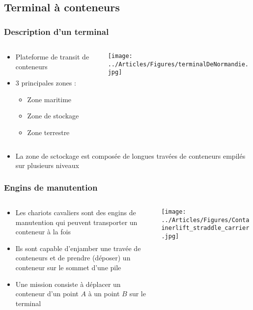 \documentclass{beamer}
\begin{document}
\subsection*{Terminal à conteneurs}
\begin{frame}
\frametitle{Description d'un terminal}

 	\begin{columns}
 	 	\begin{column}[l]{4.5cm}
			\begin{itemize}
				\item Plateforme de transit de conteneurs
				\item 3 principales zones : 
				\begin{itemize}
 					\item Zone maritime
					\item Zone de stockage
					\item Zone terrestre
				\end{itemize}
			\end{itemize}
		\end{column}
 	 	\begin{column}[r]{7.5cm}
			\begin{flushright}
				\texttt{[image: ../Articles/Figures/terminalDeNormandie.jpg]}
			\end{flushright}
		\end{column}
 	\end{columns}
\begin{itemize}
\item La zone de sctockage est composée de longues travées de conteneurs empilés sur plusieurs niveaux
\end{itemize}
\end{frame}
\begin{frame}
 \frametitle{Engins de manutention}
\begin{columns}
  \begin{column}[l]{8cm}
    \begin{itemize}
    \item Les chariots cavaliers sont des engins de manutention qui peuvent transporter un conteneur à la fois
    \item Ils sont capable d'enjamber une travée de conteneurs et de prendre (déposer) un conteneur sur le sommet d'une pile
    \item Une mission consiste à déplacer un conteneur d'un point $A$ à un point $B$ sur le terminal
    \end{itemize}
  \end{column}
  \begin{column}[r]{3cm}
	\begin{flushright}
	    \texttt{[image: ../Articles/Figures/Containerlift\_straddle\_carrier.jpg]}
	\end{flushright}
  \end{column}
\end{columns}	
\end{frame}
\end{document}
